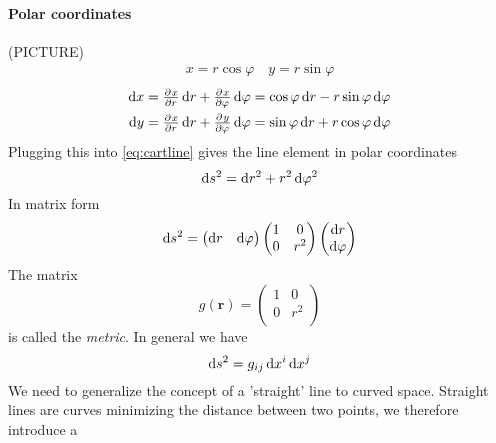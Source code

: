 \documentclass[
    a4paper,                                               %
    oneside,                                               %
    12pt,                                                  %
    headsepline,                                           %
    xcolor=dvipsnames
    ]{scrreprt}
\theoremstyle{definition}
\theoremstyle{remark}
\renewcommand{\vec}{\mathbf}
\begin{document}
 	    \paragraph{Polar coordinates} 
 	    (PICTURE)
 	    \begin{align*}
	 	    x= r\cos\varphi\quad y= r\sin\varphi
 	    \end{align*}
	    \begin{align*}
	    \dif x&= \pd{x}{r}\dif r+\pd{x}{\varphi}\dif \varphi = \cos\varphi\dif r-r\sin\varphi\dif \varphi\\
	    \dif y&= \pd{x}{r}\dif r+\pd{y}{\varphi}\dif \varphi = \sin\varphi\dif r+r\cos\varphi\dif \varphi
	    \end{align*}
	    Plugging this into \eqref{eq:cartline} gives the line element in polar coordinates
 	    \begin{equation}
 	    \dif s^2=\dif r^2+r^2\dif \varphi^2
 	    \end{equation}
    	In matrix form
    	\begin{equation}
    		\dif s^2=\begin{pmatrix}
    		\dif r& \dif \varphi 
    		\end{pmatrix}
	 		\begin{pmatrix}
	 		1& 0\\
	 		0& r^2\\ 
	 		\end{pmatrix}
	 		\begin{pmatrix}
	 		\dif r\\ \dif \varphi 
	 		\end{pmatrix}
    	\end{equation}
    	The matrix 
    	\begin{equation}
		   	g(\vec{r})= \begin{pmatrix}
		   	1& 0\\
		   	0& r^2\\ 
		   	\end{pmatrix}
    	\end{equation}
    	is called the \emph{metric}.
    	In general we have
    	\begin{equation}
    	\dif s^2 = g_{ij}\dif x^i\dif x^j
    	\end{equation}
    		We need to generalize the concept of a 'straight' line to curved space. Straight lines are curves minimizing the distance between two points, we therefore introduce a
\end{document}
